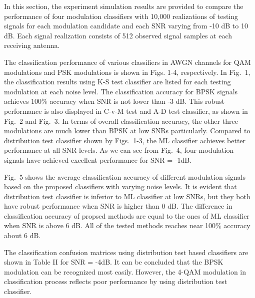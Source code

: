 \documentclass[conference]{IEEEtran}
\begin{document}
In this section, the experiment simulation results are provided to compare the performance of four modulation classifiers with 10,000 realizations of testing signals for each modulation candidate and each SNR varying from -10 dB to 10 dB. Each signal realization consists of 512 observed signal samples at each receiving antenna.
\par The classification performance of various classifiers in AWGN channels for QAM modulations and PSK modulations is shown in Figs. 1-4, respectively. In Fig.~1, the classification results using K-S test classifier are listed for each testing modulation at each noise level. The classification accuracy for BPSK signals achieves 100\% accuracy when SNR is not lower than -3 dB. This robust performance is also displayed in C-v-M test and A-D test classifier, as shown in Fig.~2 and Fig.~3. In terms of overall classification accuracy, the other three modulations are much lower than BPSK at low SNRs particularly. Compared to distribution test classifier shown by Figs.~1-3, the ML classifier achieves better performance at all SNR levels. As we can see from Fig.~4, four modulation signals have achieved excellent performance for SNR = -1dB.
\par Fig.~5 shows the average classification accuracy of different modulation signals based on the proposed classifiers with varying noise levels. It is evident that distribution test classifier is inferior to ML classifier at low SNRs, but they both have robust performance when SNR is higher than 0 dB. The difference in classification accuracy of propsed methods are equal to the ones of ML classifier when SNR is above 6 dB. All of the tested methods reaches near 100\% accuracy about 6 dB.
\par The classification confusion matrices using distribution test based classifiers are shown in Table II for SNR = -4dB. It can be concluded that the BPSK modulation can be recognized most easily. However, the 4-QAM modulation in classification process reflects poor performance by using distribution test classifier.
\end{document}
